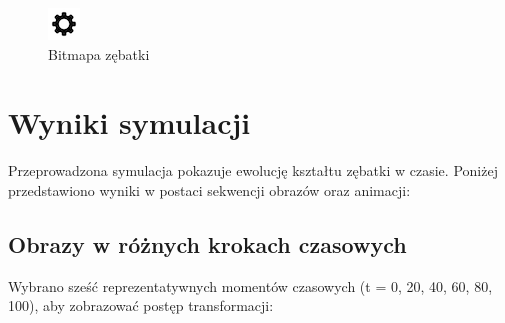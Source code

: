 \documentclass{article}
\begin{document}
\begin{figure}[H]
    \centering
    \includegraphics[width=0.8\linewidth]{gear-icon.png}
    \caption{Bitmapa zębatki}
    \label{fig:height-map}
\end{figure}

\section{Wyniki symulacji}
Przeprowadzona symulacja pokazuje ewolucję kształtu zębatki w czasie. Poniżej przedstawiono wyniki w postaci sekwencji obrazów oraz animacji:

\subsection{Obrazy w różnych krokach czasowych}
Wybrano sześć reprezentatywnych momentów czasowych (t = 0, 20, 40, 60, 80, 100), aby zobrazować postęp transformacji:
\end{document}
